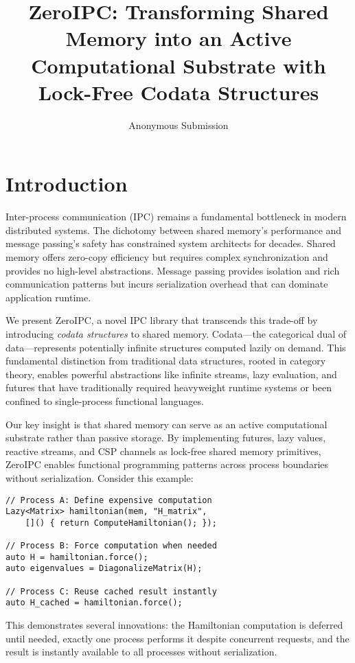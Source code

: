 \documentclass[sigconf,anonymous]{acmart}
\title{ZeroIPC: Transforming Shared Memory into an Active\\Computational Substrate with Lock-Free Codata Structures}
\author{Anonymous Submission}
\affiliation{%
  \institution{Submission \#XXX for Review}
}
\begin{document}
\maketitle

\section{Introduction}

Inter-process communication (IPC) remains a fundamental bottleneck in modern distributed systems. The dichotomy between shared memory's performance and message passing's safety has constrained system architects for decades. Shared memory offers zero-copy efficiency but requires complex synchronization and provides no high-level abstractions. Message passing provides isolation and rich communication patterns but incurs serialization overhead that can dominate application runtime.

We present ZeroIPC, a novel IPC library that transcends this trade-off by introducing \emph{codata structures} to shared memory. Codata---the categorical dual of data---represents potentially infinite structures computed lazily on demand. This fundamental distinction from traditional data structures, rooted in category theory, enables powerful abstractions like infinite streams, lazy evaluation, and futures that have traditionally required heavyweight runtime systems or been confined to single-process functional languages.

Our key insight is that shared memory can serve as an active computational substrate rather than passive storage. By implementing futures, lazy values, reactive streams, and CSP channels as lock-free shared memory primitives, ZeroIPC enables functional programming patterns across process boundaries without serialization. Consider this example:

\begin{lstlisting}[caption={Cross-Process Lazy Matrix Computation}]
// Process A: Define expensive computation  
Lazy<Matrix> hamiltonian(mem, "H_matrix",
    []() { return ComputeHamiltonian(); });

// Process B: Force computation when needed
auto H = hamiltonian.force();  
auto eigenvalues = DiagonalizeMatrix(H);

// Process C: Reuse cached result instantly
auto H_cached = hamiltonian.force();
\end{lstlisting}

This demonstrates several innovations: the Hamiltonian computation is deferred until needed, exactly one process performs it despite concurrent requests, and the result is instantly available to all processes without serialization.
\end{document}
